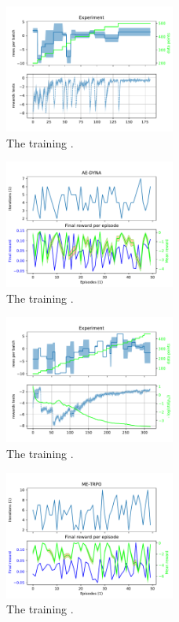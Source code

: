 \documentclass[
 reprint,
 amsmath,amssymb,amsfonts,clevref,
 aps,
prstab,
]{revtex4-2}
\begin{document}
\begin{figure}[!h]
  \centering
  \includegraphics*[width=0.5\textwidth]{Figures/AE-DYNA_observables.pdf}
  \caption{The training .}
  \label{fig:comparsion_per}
\end{figure}

\begin{figure}[!h]
  \centering
  \includegraphics*[width=0.5\textwidth]{Figures/AE-DYNA_verification.pdf}
  \caption{The training .}
  \label{fig:comparsion_per}
\end{figure}


\begin{figure}[!h]
  \centering
  \includegraphics*[width=0.5\textwidth]{Figures/ME-TRPO_observables.pdf}
  \caption{The training .}
  \label{fig:comparsion_per}
\end{figure}
\begin{figure}[!h]
  \centering
  \includegraphics*[width=0.5\textwidth]{Figures/ME-TRPO_verification.pdf}
  \caption{The training .}
  \label{fig:comparsion_per}
\end{figure}
\end{document}

